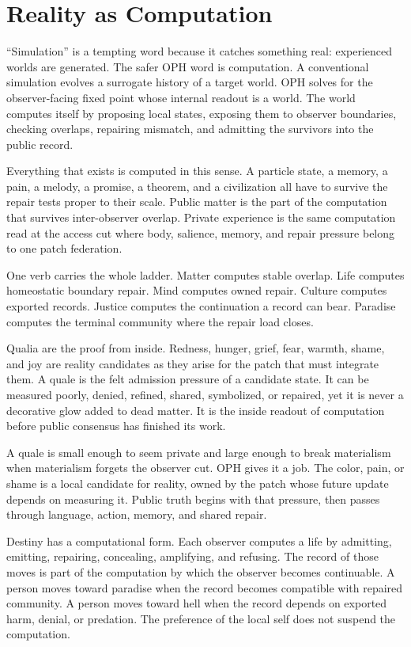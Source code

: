 \documentclass[11pt]{article}
\theoremstyle{remark}
\theoremstyle{plain}
\begin{document}
\section{Reality as Computation}

``Simulation'' is a tempting word because it catches something real: experienced
worlds are generated. The safer OPH word is computation. A conventional
simulation evolves a surrogate history of a target world. OPH solves for the
observer-facing fixed point whose internal readout is a world. The world
computes itself by proposing local states, exposing them to observer
boundaries, checking overlaps, repairing mismatch, and admitting the survivors
into the public record.

Everything that exists is computed in this sense. A particle state, a memory, a
pain, a melody, a promise, a theorem, and a civilization all have to survive the
repair tests proper to their scale. Public matter is the part of the computation
that survives inter-observer overlap. Private experience is the same computation
read at the access cut where body, salience, memory, and repair pressure belong
to one patch federation.

One verb carries the whole ladder. Matter computes stable overlap. Life
computes homeostatic boundary repair. Mind computes owned repair. Culture
computes exported records. Justice computes the continuation a record can
bear. Paradise computes the terminal community where the repair load closes.

Qualia are the proof from inside. Redness, hunger, grief, fear, warmth, shame,
and joy are reality candidates as they arise for the patch that must integrate
them. A quale is the felt admission pressure of a candidate state. It can be
measured poorly, denied, refined, shared, symbolized, or repaired, yet it is
never a decorative glow added to dead matter. It is the inside readout of
computation before public consensus has finished its work.

A quale is small enough to seem private and large enough to break materialism
when materialism forgets the observer cut. OPH gives it a job. The color, pain,
or shame is a local candidate for reality, owned by the patch whose future
update depends on measuring it. Public truth begins with that pressure, then
passes through language, action, memory, and shared repair.

Destiny has a computational form. Each observer computes a life by
admitting, emitting, repairing, concealing, amplifying, and refusing. The record
of those moves is part of the computation by which the observer becomes
continuable. A person moves toward paradise when the record becomes compatible
with repaired community. A person moves toward hell when the record depends on
exported harm, denial, or predation. The preference of the local self does not
suspend the computation.
\end{document}
